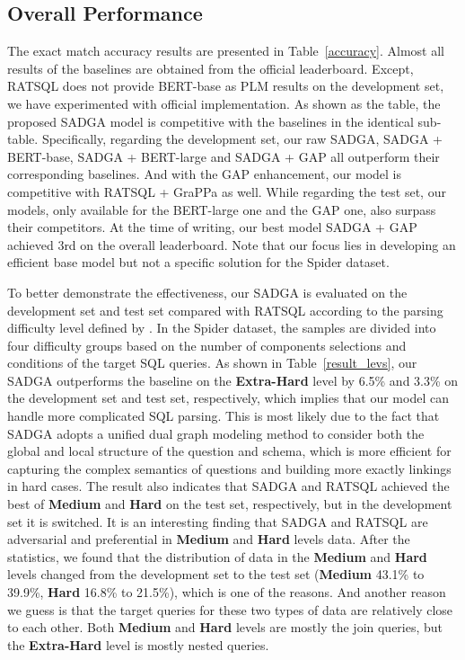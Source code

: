 \documentclass{article}
\begin{document}
\subsection{Overall Performance}
The exact match accuracy results are presented in Table~\ref{accuracy}. 
Almost all results of the baselines are obtained from the official leaderboard. Except, RATSQL \citep{wang2020rat} does not provide BERT-base as PLM results on the development set, we have experimented with official implementation. As shown as the table, the proposed SADGA model is competitive with the baselines in the identical sub-table. Specifically, regarding the development set, our raw SADGA, SADGA + BERT-base, SADGA + BERT-large and SADGA + GAP all outperform their corresponding baselines. And with the GAP enhancement, our model is competitive with RATSQL + GraPPa as well. While regarding the test set, our models, only available for the BERT-large one and the GAP one, also surpass their competitors. At the time of writing, our best model SADGA + GAP achieved 3rd on the overall leaderboard. Note that our focus lies in developing an efficient base model but not a specific solution for the Spider dataset.

To better demonstrate the effectiveness, our SADGA is evaluated on the development set and test set compared with RATSQL according to the parsing difficulty level defined by \citet{yu2018spider}.
In the Spider dataset, the samples are divided into four difficulty groups based on the number of components selections and conditions of the target SQL queries. As shown in Table~\ref{result_levs}, our SADGA outperforms the baseline on the \textbf{Extra-Hard} level by 6.5\% and 3.3\% on the development set and test set, respectively, which implies that our model can handle more complicated SQL parsing. This is most likely due to the fact that SADGA adopts a unified dual graph modeling method to consider both the global and local structure of the question and schema, which is more efficient for capturing the complex semantics of questions and building more exactly linkings in hard cases. 
The result also indicates that SADGA and RATSQL achieved the best of \textbf{Medium} and \textbf{Hard} on the test set, respectively, but in the development set it is switched. It is an interesting finding that SADGA and RATSQL are adversarial and preferential in \textbf{Medium} and \textbf{Hard} levels data. After the statistics, we found that the distribution of data in the \textbf{Medium} and \textbf{Hard} levels changed from the development set to the test set (\textbf{Medium} 43.1\% to 39.9\%, \textbf{Hard} 16.8\% to 21.5\%), which is one of the reasons. And another reason we guess is that the target queries for these two types of data are relatively close to each other. Both \textbf{Medium} and \textbf{Hard} levels are mostly the join queries, but the \textbf{Extra-Hard} level is mostly nested queries.
\end{document}

